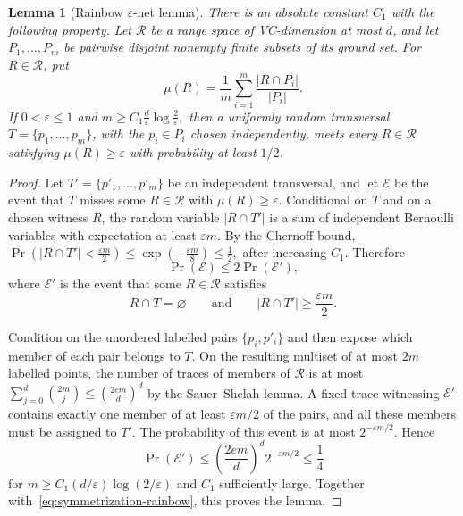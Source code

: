 \documentclass[11pt]{article}
\newtheorem{lem}[thm]{Lemma}
\theoremstyle{definition}
\begin{document}
\begin{lem}[Rainbow $\varepsilon$-net lemma]
\label{lem:rainbow-epsilon-net}
There is an absolute constant $C_1$ with the following property.  Let
$\mathcal R$ be a range space of VC-dimension at most $d$, and let
$P_1,\ldots,P_m$ be pairwise disjoint nonempty finite subsets of its
ground set.  For $R\in\mathcal R$, put
\[
\mu(R)=\frac1m\sum_{i=1}^m
\frac{|R\cap P_i|}{|P_i|}.
\]
If $0<\varepsilon\le1$ and
$m\ge C_1\frac d\varepsilon\log\frac2\varepsilon,$
then a uniformly random transversal
$T=\{p_1,\ldots,p_m\}$, with the $p_i\in P_i$ chosen independently,
meets every $R\in\mathcal R$ satisfying $\mu(R)\ge\varepsilon$ with
probability at least $1/2$.
\end{lem}

\begin{proof}
Let $T'=\{p'_1,\ldots,p'_m\}$ be an independent transversal,
and let $\mathcal E$ be the event that $T$ misses some
$R\in\mathcal R$ with $\mu(R)\ge\varepsilon$.  Conditional on $T$ and
on a chosen witness $R$, the random variable $|R\cap T'|$ is a sum of
independent Bernoulli variables with expectation at least
$\varepsilon m$.  By the Chernoff bound,
$\Pr\left(
|R\cap T'|<\frac{\varepsilon m}{2}
\right)
\le
\exp\left(-\frac{\varepsilon m}{8}\right)
\le\frac12,$
after increasing $C_1$.  Therefore
\begin{equation}\label{eq:symmetrization-rainbow}
\Pr(\mathcal E)\le 2\Pr(\mathcal E'),
\end{equation}
where $\mathcal E'$ is the event that some $R\in\mathcal R$ satisfies
\[
R\cap T=\varnothing
\qquad\text{and}\qquad
|R\cap T'|\ge\frac{\varepsilon m}{2}.
\]

Condition on the unordered labelled pairs
$\{p_i,p'_i\}$ and then expose which member of each pair belongs to
$T$.  On the resulting multiset of at most $2m$ labelled points, the
number of traces of members of $\mathcal R$ is at most
$\sum_{j=0}^d\binom{2m}{j}
\le
\left(\frac{2em}{d}\right)^d$
by the Sauer--Shelah lemma.  A fixed trace witnessing $\mathcal E'$
contains exactly one member of at least $\varepsilon m/2$ of the
pairs, and all these members must be assigned to $T'$.  The
probability of this event is at most $2^{-\varepsilon m/2}$.  Hence
\[
\Pr(\mathcal E')
\le
\left(\frac{2em}{d}\right)^d2^{-\varepsilon m/2}
\le\frac14
\]
for
$m\ge C_1(d/\varepsilon)\log(2/\varepsilon)$ and $C_1$ sufficiently
large.  Together with~\eqref{eq:symmetrization-rainbow}, this proves
the lemma.
\end{proof}
\end{document}
